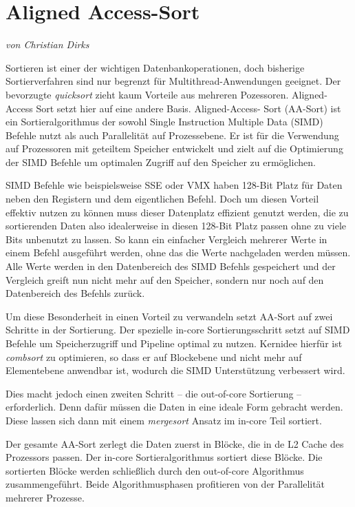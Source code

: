 \section{Aligned Access-Sort}
\label{sec:Sort_2_AA-Sort}
\textit{von Christian Dirks}

Sortieren ist einer der wichtigen Datenbankoperationen, doch bisherige Sortierverfahren sind nur begrenzt für Multithread-Anwendungen geeignet. Der bevorzugte \textit{quicksort} zieht kaum Vorteile aus mehreren Pozessoren. Aligned-Access Sort \cite{INOUE} setzt hier auf eine andere Basis. Aligned-Access- Sort (AA-Sort) ist ein Sortieralgorithmus der sowohl Single Instruction Multiple Data (SIMD) Befehle nutzt als auch Parallelität auf Prozessebene. Er ist für die Verwendung auf Prozessoren mit geteiltem Speicher entwickelt und zielt auf die Optimierung der SIMD Befehle um optimalen Zugriff auf den Speicher zu ermöglichen.

SIMD Befehle wie beispielsweise SSE oder VMX haben 128-Bit Platz für Daten neben den Registern und dem eigentlichen Befehl. Doch um diesen Vorteil effektiv nutzen zu können muss dieser Datenplatz effizient genutzt werden, die zu sortierenden Daten also idealerweise in diesen 128-Bit Platz passen ohne zu viele Bits unbenutzt zu lassen. So kann ein einfacher Vergleich mehrerer Werte in einem Befehl ausgeführt werden, ohne das die Werte nachgeladen werden müssen. Alle Werte werden in den Datenbereich des SIMD Befehls gespeichert und der Vergleich greift nun nicht mehr auf den Speicher, sondern nur noch auf den Datenbereich des Befehls zurück.

Um diese Besonderheit in einen Vorteil zu verwandeln setzt AA-Sort auf zwei Schritte in der Sortierung. Der spezielle in-core Sortierungsschritt setzt auf SIMD Befehle um Speicherzugriff und Pipeline optimal zu nutzen. Kernidee hierfür ist \textit{combsort} \cite{LACEY} zu optimieren, so dass er auf Blockebene und nicht mehr auf Elementebene anwendbar ist, wodurch die SIMD Unterstützung verbessert wird.

Dies macht jedoch einen zweiten Schritt – die out-of-core Sortierung – erforderlich. Denn dafür müssen die Daten in eine ideale Form gebracht werden. Diese lassen sich dann mit einem \textit{mergesort} Ansatz im in-core Teil sortiert.

Der gesamte AA-Sort zerlegt die Daten zuerst in Blöcke, die in de L2 Cache des Prozessors passen. Der in-core Sortieralgorithmus sortiert diese Blöcke. Die sortierten Blöcke werden schließlich durch den out-of-core Algorithmus zusammengeführt. Beide Algorithmusphasen profitieren von der Parallelität mehrerer Prozesse.


